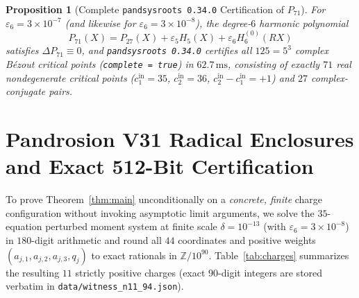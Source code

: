 \documentclass[11pt,a4paper]{amsart}
\newtheorem{proposition}[theorem]{Proposition}
\theoremstyle{definition}
\newcommand{\Z}{\mathbb{Z}}
\begin{document}
\begin{proposition}[Complete \texttt{pandsysroots~0.34.0} Certification of $P_{71}$]\label{prop:p71}
For $\varepsilon_6 = 3 \times 10^{-7}$ (and likewise for $\varepsilon_6 = 3 \times 10^{-8}$),
the degree-$6$ harmonic polynomial
\[
  P_{71}(X) = P_{27}(X) + \varepsilon_5 H_5(X) + \varepsilon_6 H_6^{(0)}(R X)
\]
satisfies $\Delta P_{71} \equiv 0$, and \texttt{pandsysroots~0.34.0} certifies
all $125 = 5^3$ complex B\'ezout critical points (\texttt{complete = true}) in
$62.7\,\mathrm{ms}$, consisting of exactly $71$ real nondegenerate critical
points ($c_1^{\mathrm{in}} = 35$, $c_2^{\mathrm{in}} = 36$,
$c_2^{\mathrm{in}} - c_1^{\mathrm{in}} = +1$) and $27$ complex-conjugate pairs.
\end{proposition}

\section{Pandrosion V31 Radical Enclosures and Exact 512-Bit Certification}\label{sec:cert}

To prove Theorem~\ref{thm:main} unconditionally on a \emph{concrete, finite}
charge configuration without invoking asymptotic limit arguments, we solve the
$35$-equation perturbed moment system at finite scale $\delta = 10^{-13}$ (with
$\varepsilon_6 = 3\times 10^{-8}$) in $180$-digit arithmetic and round all $44$
coordinates and positive weights $(a_{j,1}, a_{j,2}, a_{j,3}, q_j)$ to exact
rationals in $\Z / 10^{90}$. Table~\ref{tab:charges} summarizes the resulting
$11$ strictly positive charges (exact $90$-digit integers are stored verbatim in
\texttt{data/witness\_n11\_94.json}).
\end{document}
